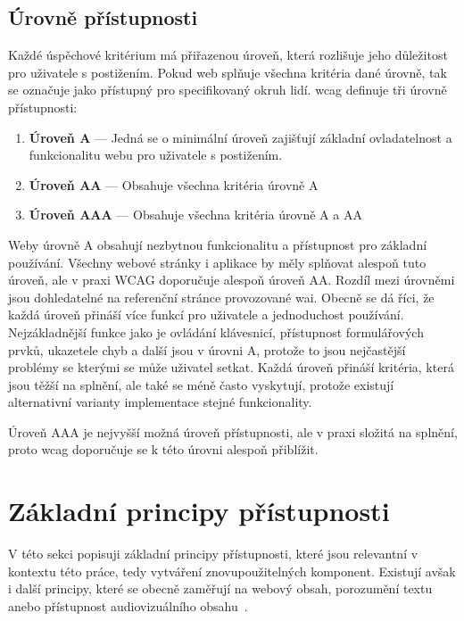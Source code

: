 \subsection{Úrovně přístupnosti}

Každé úspěchové kritérium má přiřazenou úroveň, která rozlišuje jeho důležitost pro uživatele s postižením.
Pokud web splňuje všechna kritéria dané úrovně, tak se označuje jako přístupný pro specifikovaný okruh lidí.
\gls{wcag} definuje tři úrovně přístupnosti:

\begin{enumerate}
  \item \textbf{Úroveň A} --- Jedná se o minimální úroveň zajišťují základní ovladatelnost a funkcionalitu webu pro uživatele s postižením.
  \item \textbf{Úroveň AA} --- Obsahuje všechna kritéria úrovně A
  \item \textbf{Úroveň AAA} --- Obsahuje všechna kritéria úrovně A a AA
\end{enumerate}

Weby úrovně A obsahují nezbytnou funkcionalitu a přístupnost pro základní používání.
Všechny webové stránky i aplikace by měly splňovat alespoň tuto úroveň, ale v praxi WCAG doporučuje alespoň úroveň AA.
Rozdíl mezi úrovněmi jsou dohledatelné na referenční stránce provozované \gls{wai}.
Obecně se dá říci, že každá úroveň přináší více funkcí pro uživatele a jednoduchost používání.
Nejzákladnější funkce jako je ovládání klávesnicí, přístupnost formulářových prvků, ukazetele chyb a další jsou v úrovni A, protože to jsou nejčastější problémy se kterými se může uživatel setkat.
Každá úroveň přináší kritéria, která jsou těžší na splnění, ale také se méně často vyskytují, protože existují alternativní varianty implementace stejné funkcionality.

Úroveň AAA je nejvyšší možná úroveň přístupnosti, ale v praxi složitá na splnění, proto \gls{wcag} doporučuje se k této úrovni alespoň přiblížit.

\section{Základní principy přístupnosti}


V této sekci popisuji základní principy přístupnosti, které jsou relevantní v kontextu této práce, tedy vytváření znovupoužitelných komponent.
Existují avšak i další principy, které se obecně zaměřují na webový obsah, porozumění textu anebo přístupnost audiovizuálního obsahu~\cite{w3-accessibility-principles}.

